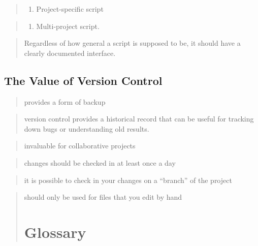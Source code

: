 \documentclass[12pt,]{book}
\providecommand{\tightlist}{%
  \setlength{\itemsep}{0pt}\setlength{\parskip}{0pt}}
\begin{document}
\begin{quote}
\begin{enumerate}
\def\labelenumi{\arabic{enumi}.}
\setcounter{enumi}{2}
\tightlist
\item
  Project-specific script
\end{enumerate}
\end{quote}

\begin{quote}
\begin{enumerate}
\def\labelenumi{\arabic{enumi}.}
\setcounter{enumi}{3}
\tightlist
\item
  Multi-project script.
\end{enumerate}
\end{quote}

\begin{quote}
Regardless of how general a script is supposed to be, it should have a
clearly documented interface.
\end{quote}

\section{The Value of Version
Control}\label{the-value-of-version-control}

\begin{quote}
provides a form of backup
\end{quote}

\begin{quote}
version control provides a historical record that can be useful for
tracking down bugs or understanding old results.
\end{quote}

\begin{quote}
invaluable for collaborative projects
\end{quote}

\begin{quote}
changes should be checked in at least once a day
\end{quote}

\begin{quote}
it is possible to check in your changes on a ``branch'' of the project
\end{quote}

\begin{quote}
should only be used for files that you edit by hand \chapter{Glossary}
\end{quote}
\end{document}

